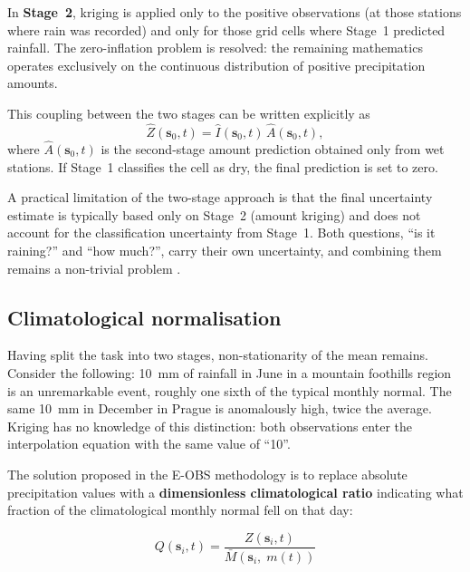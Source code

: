 In \textbf{Stage~2}, kriging is applied only to the positive observations (at those
stations where rain was recorded) and only for those grid cells where Stage~1 predicted
rainfall. The zero-inflation problem is resolved: the remaining mathematics operates
exclusively on the continuous distribution of positive precipitation amounts.

This coupling between the two stages can be written explicitly as
\begin{equation}
  \hat{Z}(\mathbf{s}_0, t)
  =
  \widehat{I}(\mathbf{s}_0, t)\, \hat{A}(\mathbf{s}_0, t),
  \label{eq:two-stage-predictor}
\end{equation}
where $\hat{A}(\mathbf{s}_0, t)$ is the second-stage amount prediction obtained only from
wet stations. If Stage~1 classifies the cell as dry, the final prediction is set to zero.

A practical limitation of the two-stage approach is that the final uncertainty
estimate is typically based only on Stage~2 (amount kriging) and does not account for the
classification uncertainty from Stage~1. Both questions, ``is it raining?'' and ``how
much?'', carry their own uncertainty, and combining them remains a non-trivial problem
\cite{haylock2008european}.

\subsection{Climatological normalisation}
\label{sec:theory-quota}

Having split the task into two stages, non-stationarity of the mean remains.
Consider the following: 10~mm of rainfall in June in a mountain foothills region is an
unremarkable event, roughly one sixth of the typical monthly normal. The same 10~mm in
December in Prague is anomalously high, twice the average. Kriging has no knowledge of
this distinction: both observations enter the interpolation equation with the same value
of ``10''.

The solution proposed in the E-OBS methodology \cite{haylock2008european} is to
replace absolute precipitation values with a \textbf{dimensionless climatological ratio}
indicating what fraction of the climatological monthly normal fell on that day:

\begin{equation}
  Q(\mathbf{s}_i, t) = \frac{Z(\mathbf{s}_i, t)}{\bar{M}(\mathbf{s}_i,\; m(t))}
  \label{eq:quota}
\end{equation}


